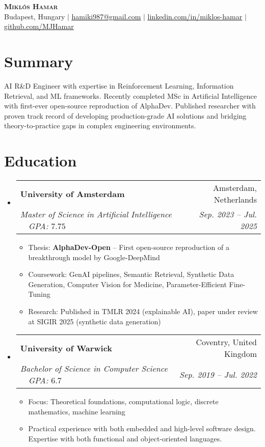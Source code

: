 \documentclass[letterpaper,11pt]{article}
\makeatletter
\newcommand{\resumeItem}[1]{
  \item\small{
    {#1 \vspace{-2pt}}
  }
}
\newcommand{\resumeSubheading}[4]{
  \vspace{-2pt}\item
    \begin{tabular*}{0.97\textwidth}[t]{l@{\extracolsep{\fill}}r}
      \textbf{#1} & #2 \\
      \textit{\small#3} & \textit{\small #4} \\
    \end{tabular*}\vspace{-7pt}
}
\newcommand{\resumeSubHeadingListStart}{\begin{itemize}[leftmargin=0.15in, label={}]}
\newcommand{\resumeSubHeadingListEnd}{\end{itemize}}
\newcommand{\resumeItemListStart}{\begin{itemize}}
\newcommand{\resumeItemListEnd}{\end{itemize}\vspace{-5pt}}
\makeatother
\begin{document}
\begin{center}
    \textbf{\Huge \scshape Miklós Hamar} \\ \vspace{1pt}
    \small Budapest, Hungary $|$ \href{mailto:hamiki987@gmail.com}{\underline{hamiki987@gmail.com}} $|$ 
    \href{https://linkedin.com/in/miklos-hamar}{\underline{linkedin.com/in/miklos-hamar}} $|$
    \href{https://github.com/MJHamar}{\underline{github.com/MJHamar}}
\end{center}


\section{Summary}
\small{AI R\&D Engineer with expertise in Reinforcement Learning, Information Retrieval, and ML frameworks. Recently completed MSc in Artificial Intelligence with first-ever open-source reproduction of AlphaDev. Published researcher with proven track record of developing production-grade AI solutions and bridging theory-to-practice gaps in complex engineering environments.}


\section{Education}
  \resumeSubHeadingListStart
    \resumeSubheading
      {University of Amsterdam}{Amsterdam, Netherlands}
      {Master of Science in Artificial Intelligence$\quad$GPA: $7.75$}{Sep. 2023 -- Jul. 2025}
      \resumeItemListStart
        \resumeItem{Thesis: \textbf{AlphaDev-Open} -- First open-source reproduction of a breakthrough model by Google-DeepMind}
        \resumeItem{Coursework: GenAI pipelines, Semantic Retrieval, Synthetic Data Generation, Computer Vision for Medicine, Parameter-Efficient Fine-Tuning}
        \resumeItem{Research: Published in TMLR 2024 (explainable AI), paper under review at SIGIR 2025 (synthetic data generation)}
      \resumeItemListEnd
      
    \resumeSubheading
      {University of Warwick}{Coventry, United Kingdom}
      {Bachelor of Science in Computer Science$\quad$GPA: $6.7$}{Sep. 2019 -- Jul. 2022}
      \resumeItemListStart
        \resumeItem{Focus: Theoretical foundations, computational logic, discrete mathematics, machine learning}
        \resumeItem{Practical experience with both embedded and high-level software design. Expertise with both functional and object-oriented languages.}
      \resumeItemListEnd
  \resumeSubHeadingListEnd
\end{document}
